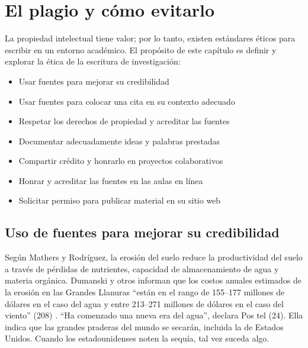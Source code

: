 \chapter{El plagio y cómo evitarlo}
La propiedad intelectual tiene valor; por lo tanto, existen estándares éticos para escribir en un entorno académico. El propósito de este capítulo es definir y explorar la ética de la escritura de investigación: 
\begin{itemize}
    \item Usar fuentes para mejorar su credibilidad 
    \item Usar fuentes para colocar una cita en su contexto adecuado 
    \item Respetar los derechos de propiedad y acreditar las fuentes 
    \item Documentar adecuadamente ideas y palabras prestadas 
    \item Compartir crédito y honrarlo en proyectos colaborativos 
    \item Honrar y acreditar las fuentes en las aulas en línea 
    \item Solicitar permiso para publicar material en su sitio web
\end{itemize}

\section{Uso de fuentes para mejorar su credibilidad}
Según Mathers y Rodríguez, la erosión del suelo reduce la productividad del suelo a través de pérdidas de nutrientes, capacidad de almacenamiento de agua y materia orgánica. Dumanski y otros informan que los costos anuales estimados de la erosión en las Grandes Llanuras “están en el rango de 155–177 millones de dólares en el caso del agua y entre 213–271 millones de dólares en el caso del viento” (208) . “Ha comenzado una nueva era del agua”, declara Pos tel (24). Ella indica que las grandes praderas del mundo se secarán, incluida la de Estados Unidos. Cuando los estadounidenses noten la sequía, tal vez suceda algo.\\

